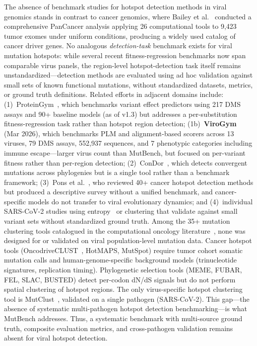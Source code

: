 The absence of benchmark studies for hotspot detection methods in viral genomics stands in contrast to cancer genomics, where Bailey et al.~\cite{bailey2018comprehensive} conducted a comprehensive PanCancer analysis applying 26 computational tools to 9,423 tumor exomes under uniform conditions, producing a widely used catalog of cancer driver genes.
No analogous \emph{detection-task} benchmark exists for viral mutation hotspots: while several recent fitness-regression benchmarks now span comparable virus panels, the region-level hotspot-detection task itself remains unstandardized---detection methods are evaluated using ad hoc validation against small sets of known functional mutations, without standardized datasets, metrics, or ground truth definitions.
Related efforts in adjacent domains include:
(1)~ProteinGym~\cite{notin2023proteingym,notin2025proteingym_v13}, which benchmarks variant effect predictors using 217 DMS assays and 90+ baseline models (as of v1.3) but addresses a per-substitution fitness-regression task rather than hotspot region detection;
(1b)~\textbf{ViroGym}~\cite{virogym2026} (Mar 2026), which benchmarks PLM and alignment-based scorers across 13 viruses, 79 DMS assays, 552{,}937 sequences, and 7 phenotypic categories including immune escape---larger virus count than MutBench, but focused on per-variant fitness rather than per-region detection;
(2)~ConDor~\cite{morel2024condor}, which detects convergent mutations across phylogenies but is a single tool rather than a benchmark framework;
(3)~Pons et al.~\cite{pons2020computational}, who reviewed 40+ cancer hotspot detection methods but produced a descriptive survey without a unified benchmark, and cancer-specific models do not transfer to viral evolutionary dynamics;
and (4)~individual SARS-CoV-2 studies using entropy~\cite{harvey2021tracking} or clustering that validate against small variant sets without standardized ground truth.
Among the 35+ mutation clustering tools catalogued in the computational oncology literature~\cite{pons2020computational}, none was designed for or validated on viral population-level mutation data. Cancer hotspot tools (OncodriveCLUST~\cite{tamborero2013oncodriveclust}, HotMAPS, MutSpot) require tumor cohort somatic mutation calls and human-genome-specific background models (trinucleotide signatures, replication timing). Phylogenetic selection tools (MEME, FUBAR, FEL, SLAC, BUSTED) detect per-codon dN/dS signals but do not perform spatial clustering of hotspot regions. The only virus-specific hotspot clustering tool is MutClust~\cite{youn2025mutclust}, validated on a single pathogen (SARS-CoV-2). This gap---the absence of systematic multi-pathogen hotspot detection benchmarking---is what MutBench addresses.
Thus, a systematic benchmark with multi-source ground truth, composite evaluation metrics, and cross-pathogen validation remains absent for viral hotspot detection.


